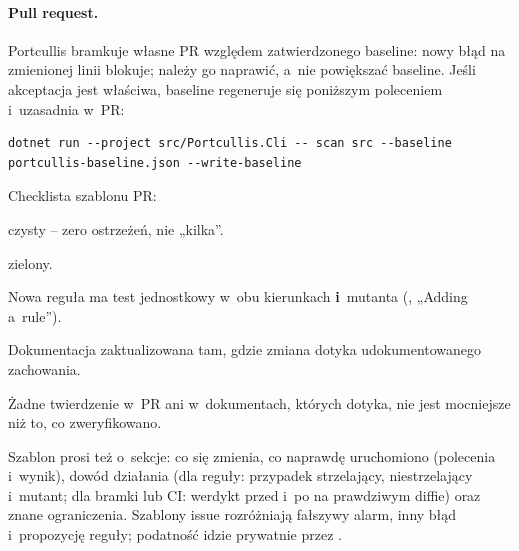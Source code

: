 \paragraph{Pull request.} Portcullis bramkuje własne PR względem zatwierdzonego baseline:
nowy błąd na zmienionej linii blokuje; należy go naprawić, a~nie powiększać baseline. Jeśli
akceptacja jest właściwa, baseline regeneruje się poniższym poleceniem i~uzasadnia w~PR:

\begin{lstlisting}
dotnet run --project src/Portcullis.Cli -- scan src --baseline portcullis-baseline.json --write-baseline
\end{lstlisting}

Checklista szablonu PR:
\begin{checklista}
  \item {} czysty -- zero ostrzeżeń, nie „kilka”.
  \item {} zielony.
  \item Nowa reguła ma test jednostkowy w~obu kierunkach \textbf{i}~mutanta
        (, „Adding a~rule”).
  \item Dokumentacja zaktualizowana tam, gdzie zmiana dotyka udokumentowanego zachowania.
  \item Żadne twierdzenie w~PR ani w~dokumentach, których dotyka, nie jest mocniejsze niż
        to, co zweryfikowano.
\end{checklista}
Szablon prosi też o~sekcje: co się zmienia, co naprawdę uruchomiono (polecenia i~wynik),
dowód działania (dla reguły: przypadek strzelający, niestrzelający i~mutant; dla bramki lub
CI: werdykt przed i~po na prawdziwym diffie) oraz znane ograniczenia. Szablony issue
rozróżniają fałszywy alarm, inny błąd i~propozycję reguły; podatność idzie prywatnie przez
.

